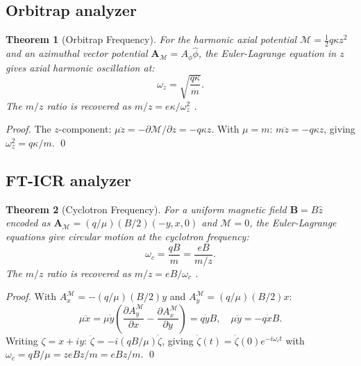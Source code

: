 \documentclass[twocolumn,10pt,a4paper]{article}
\theoremstyle{thmstyle}
\newtheorem{theorem}{Theorem}[section]
\theoremstyle{definition}
\theoremstyle{remark}
\newcommand{\AM}{\mathbf{A}_{\mathcal{M}}}
\newcommand{\Mop}{\mathcal{M}}
\begin{document}
\subsection{Orbitrap analyzer}

\begin{theorem}[Orbitrap Frequency]
\label{thm:orbitrap}
For the harmonic axial potential $\Mop = \tfrac{1}{2}q\kappa z^2$
and an azimuthal vector potential $\AM = A_\phi\hat{\phi}$,
the Euler-Lagrange equation in $z$ gives axial harmonic oscillation at:
\begin{equation}
\omega_z = \sqrt{\frac{q\kappa}{m}}.
\label{eq:orbitrap}
\end{equation}
The $m/z$ ratio is recovered as $m/z = e\kappa/\omega_z^2$
\citep{makarov2000}.
\end{theorem}

\begin{proof}
The $z$-component: $\mu\ddot{z} = -\partial\Mop/\partial z = -q\kappa z$.
With $\mu = m$: $m\ddot{z} = -q\kappa z$, giving
$\omega_z^2 = q\kappa/m$. \qed
\end{proof}

\subsection{FT-ICR analyzer}

\begin{theorem}[Cyclotron Frequency]
\label{thm:fticr}
For a uniform magnetic field $\mathbf{B} = B\hat{z}$ encoded as
$\AM = (q/\mu)(B/2)(-y, x, 0)$ and $\Mop = 0$, the Euler-Lagrange
equations give circular motion at the cyclotron frequency:
\begin{equation}
\omega_c = \frac{qB}{m} = \frac{eB}{m/z}.
\label{eq:fticr}
\end{equation}
The $m/z$ ratio is recovered as $m/z = eB/\omega_c$
\citep{marshall1998}.
\end{theorem}

\begin{proof}
With $A_x^{\mathcal{M}} = -(q/\mu)(B/2)y$ and
$A_y^{\mathcal{M}} = (q/\mu)(B/2)x$:
\[
\mu\ddot{x} = \mu\dot{y}\!\left(\frac{\partial A_y^{\mathcal{M}}}{\partial x}
- \frac{\partial A_x^{\mathcal{M}}}{\partial y}\right) = q\dot{y}B,
\quad
\mu\ddot{y} = -q\dot{x}B.
\]
Writing $\zeta = x + iy$: $\ddot{\zeta} = -i(qB/\mu)\dot{\zeta}$,
giving $\dot{\zeta}(t) = \dot{\zeta}(0)e^{-i\omega_c t}$ with
$\omega_c = qB/\mu = zeBz/m = eB z/m$. \qed
\end{proof}
\end{document}
